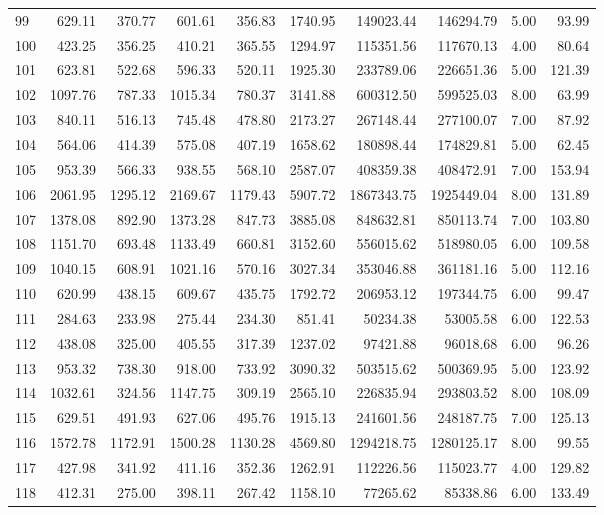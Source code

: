 \begin{tabular}{lrrrrrrrrr}
99 & 629.11 & 370.77 & 601.61 & 356.83 & 1740.95 & 149023.44 & 146294.79 & 5.00 & 93.99 \\
100 & 423.25 & 356.25 & 410.21 & 365.55 & 1294.97 & 115351.56 & 117670.13 & 4.00 & 80.64 \\
101 & 623.81 & 522.68 & 596.33 & 520.11 & 1925.30 & 233789.06 & 226651.36 & 5.00 & 121.39 \\
102 & 1097.76 & 787.33 & 1015.34 & 780.37 & 3141.88 & 600312.50 & 599525.03 & 8.00 & 63.99 \\
103 & 840.11 & 516.13 & 745.48 & 478.80 & 2173.27 & 267148.44 & 277100.07 & 7.00 & 87.92 \\
104 & 564.06 & 414.39 & 575.08 & 407.19 & 1658.62 & 180898.44 & 174829.81 & 5.00 & 62.45 \\
105 & 953.39 & 566.33 & 938.55 & 568.10 & 2587.07 & 408359.38 & 408472.91 & 7.00 & 153.94 \\
106 & 2061.95 & 1295.12 & 2169.67 & 1179.43 & 5907.72 & 1867343.75 & 1925449.04 & 8.00 & 131.89 \\
107 & 1378.08 & 892.90 & 1373.28 & 847.73 & 3885.08 & 848632.81 & 850113.74 & 7.00 & 103.80 \\
108 & 1151.70 & 693.48 & 1133.49 & 660.81 & 3152.60 & 556015.62 & 518980.05 & 6.00 & 109.58 \\
109 & 1040.15 & 608.91 & 1021.16 & 570.16 & 3027.34 & 353046.88 & 361181.16 & 5.00 & 112.16 \\
110 & 620.99 & 438.15 & 609.67 & 435.75 & 1792.72 & 206953.12 & 197344.75 & 6.00 & 99.47 \\
111 & 284.63 & 233.98 & 275.44 & 234.30 & 851.41 & 50234.38 & 53005.58 & 6.00 & 122.53 \\
112 & 438.08 & 325.00 & 405.55 & 317.39 & 1237.02 & 97421.88 & 96018.68 & 6.00 & 96.26 \\
113 & 953.32 & 738.30 & 918.00 & 733.92 & 3090.32 & 503515.62 & 500369.95 & 5.00 & 123.92 \\
114 & 1032.61 & 324.56 & 1147.75 & 309.19 & 2565.10 & 226835.94 & 293803.52 & 8.00 & 108.09 \\
115 & 629.51 & 491.93 & 627.06 & 495.76 & 1915.13 & 241601.56 & 248187.75 & 7.00 & 125.13 \\
116 & 1572.78 & 1172.91 & 1500.28 & 1130.28 & 4569.80 & 1294218.75 & 1280125.17 & 8.00 & 99.55 \\
117 & 427.98 & 341.92 & 411.16 & 352.36 & 1262.91 & 112226.56 & 115023.77 & 4.00 & 129.82 \\
118 & 412.31 & 275.00 & 398.11 & 267.42 & 1158.10 & 77265.62 & 85338.86 & 6.00 & 133.49 \\

\end{tabular}
